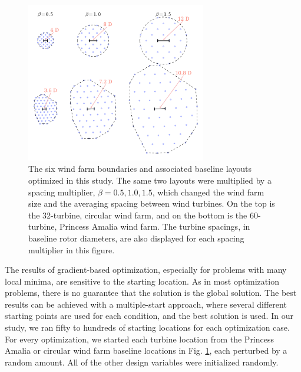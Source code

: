 \begin{figure}[htbp]
  \centering
  \includegraphics[width=0.7\textwidth]{Figures/spacing_multipliers.pdf}
  \caption{\label{farm_spacings}The six wind farm boundaries and associated baseline layouts optimized in this study. The same two layouts were multiplied by a spacing multiplier, $\beta=0.5,1.0,1.5$, which changed the wind farm size and the averaging spacing between wind turbines.  On the top is the 32-turbine, circular wind farm, and on the bottom is the 60-turbine, Princess Amalia wind farm. The turbine spacings, in baseline rotor diameters, are also displayed for each spacing multiplier in this figure.}
\end{figure}

The results of gradient-based optimization, especially for problems with many local minima, are sensitive to the starting location. As in most optimization problems, there is no guarantee that the solution is the global solution. The best results can be achieved with a multiple-start approach, where several different starting points are used for each condition, and the best solution is used. In our study, we ran fifty to hundreds of starting locations for each optimization case. For every optimization, we started each turbine location from the Princess Amalia or circular wind farm baseline locations in Fig. \ref{farm_spacings}, each perturbed by a random amount. All of the other design variables were initialized randomly.




